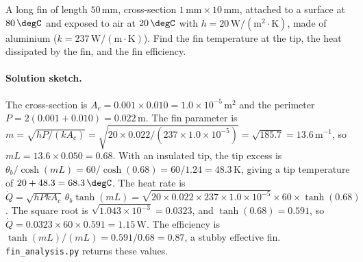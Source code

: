 \begin{exercise}
A long fin of length $50\,\si{\milli\meter}$, cross-section $1\,\si{
\milli\meter}\times 10\,\si{\milli\meter}$, attached to a surface at
$80\,\degC$ and exposed to air at $20\,\degC$ with $h = 20\,\text{W}/
(\text{m}^2\cdot\si{\kelvin})$, made of aluminium ($k = 237\,\text{W}/
(\text{m}\cdot\si{\kelvin})$). Find the fin temperature at the tip,
the heat dissipated by the fin, and the fin efficiency.
\paragraph{Solution sketch.} The cross-section is $A_c = 0.001 \times
0.010 = 1.0\times10^{-5}\,\text{m}^2$ and the perimeter $P = 2(0.001 +
0.010) = 0.022\,\text{m}$. The fin parameter is $m = \sqrt{hP/(kA_c)} =
\sqrt{20 \times 0.022/(237 \times 1.0\times10^{-5})} = \sqrt{185.7} =
13.6\,\text{m}^{-1}$, so $mL = 13.6 \times 0.050 = 0.68$. With an
insulated tip, the tip excess is $\theta_b/\cosh(mL) = 60/\cosh(0.68) =
60/1.24 = 48.3\,\si{\kelvin}$, giving a tip temperature of $20 + 48.3 =
68.3\,\degC$. The heat rate is $\dot{Q} = \sqrt{hPkA_c}\,\theta_b
\tanh(mL) = \sqrt{20 \times 0.022 \times 237 \times 1.0\times10^{-5}}
\times 60 \times \tanh(0.68)$. The square root is $\sqrt{1.043\times
10^{-3}} = 0.0323$, and $\tanh(0.68) = 0.591$, so $\dot{Q} = 0.0323
\times 60 \times 0.591 = 1.15\,\text{W}$. The efficiency is
$\tanh(mL)/(mL) = 0.591/0.68 = 0.87$, a stubby effective fin.
\texttt{fin\_analysis.py} returns these values.
\end{exercise}

